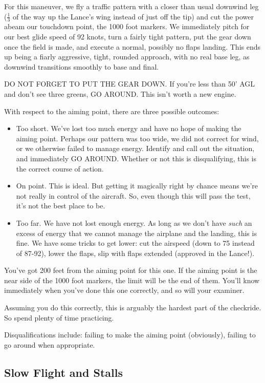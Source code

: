 For this maneuver, we fly a traffic pattern with a closer than usual downwind leg ($\frac1 3$ of the way up the Lance's wing instead of just off the tip) and cut the power abeam our touchdown point, the 1000 foot markers. We immediately pitch for our best glide speed of 92 knots, turn a fairly tight pattern, put the gear down once the field is made, and execute a normal, possibly no flaps landing. This ends up being a fiarly aggressive, tight, rounded approach, with no real base leg, as downwind transitions smoothly to base and final.

DO NOT FORGET TO PUT THE GEAR DOWN. If you're less than 50' AGL and don't see three greens, GO AROUND. This isn't worth a new engine.

With respect to the aiming point, there are three possible outcomes:

\begin{itemize}
\item{Too short.} We've lost too much energy and have no hope of making the aiming point. Perhaps our pattern was too wide, we did not correct for wind, or we otherwise failed to manage energy. Identify and call out the situation, and immediately GO AROUND. Whether or not this is disqualifying, this is the correct course of action.
\item{On point.} This is ideal. But getting it magically right by chance means we're not really in control of the aircraft. So, even though this will pass the test, it's not the best place to be.
\item{Too far.} We have not lost enough energy. As long as we don't have \emph{such} an excess of energy that we cannot manage the airplane and the landing, this is fine. We have some tricks to get lower: cut the airspeed (down to 75 instead of 87-92), lower the flaps, slip with flaps extended (approved in the Lance!).
\end{itemize}

You've got 200 feet from the aiming point for this one. If the aiming point is the near side of the 1000 foot markers, the limit will be the end of them. You'll know immediately when you've done this one correctly, and so will your examiner.

Assuming you do this correctly, this is arguably the hardest part of the checkride. So spend plenty of time practicing.

Disqualifications include: failing to make the aiming point (obviously), failing to go around when appropriate.

\subsection{Slow Flight and Stalls}

